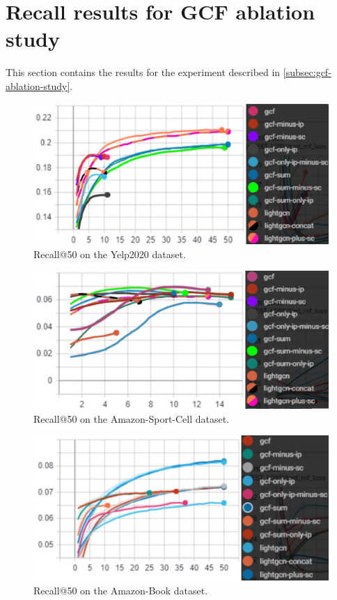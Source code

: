 \section{Recall results for GCF ablation study}\label{app:recall-results-gcf-ablation}
This section contains the results for the experiment described in \autoref{subsec:gcf-ablation-study}.

\begin{figure}[]
    \includegraphics[width=\linewidth]{figures/gcf-all-recall.png}
    \caption{Recall@50 on the Yelp2020 dataset.}
    \label{fig:GCF-recall-ablation-study}
\end{figure}
\begin{figure}[]
    \includegraphics[width=\linewidth]{figures/amazon-cell-sport-gcf-all-recall.png}
    \caption{Recall@50 on the Amazon-Sport-Cell dataset.}
    \label{fig:GCF-recall-ablation-study-amazon-cell-sport}
\end{figure}
\begin{figure}[]
    \includegraphics[width=\linewidth]{figures/amazon-book-gcf-all-recall.png}
    \caption{Recall@50 on the Amazon-Book dataset.}
    \label{fig:GCF-recall-ablation-study-amazon-book}
\end{figure}
